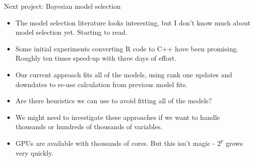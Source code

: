 \documentclass{beamer}
\begin{document}
\begin{frame}{Next project: Bayesian model selection}
\begin{itemize}
\item The model selection literature looks interesting, but I don't know much about model selection yet.
			Starting to read.
\item Some initial experiments converting R code to C++ have been promising. Roughly ten times speed-up
			with three days of effort.
\item Our current approach fits all of the models, using rank one updates and
			downdates to re-use calculation from previous model fits.
\item Are there heuristics we can use to avoid fitting all of the models?
\item We might need to investigate these approaches if we want to handle thousands or hundreds of thousands
			of variables.
\item GPUs are available with thousands of cores. But this isn't magic - $2^p$ grows very quickly.
\end{itemize}
\end{frame}
\end{document}
